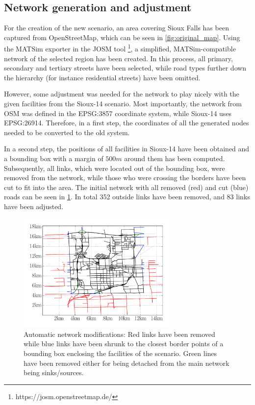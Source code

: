 \subsection{Network generation and adjustment}

For the creation of the new scenario, an area covering Sioux Falls has been captured
from OpenStreetMap, which can be seen in \cref{fig:original_map}. Using the MATSim
exporter in the JOSM tool \footnote{https://josm.openstreetmap.de/}, a simplified,
MATSim-compatible network of the selected region has been created. In this process,
all primary, secondary and tertiary streets have been selected, while road types
further down the hierarchy (for instance residential streets) have been omitted.

However, some adjustment was needed for the network to play nicely with
the given facilities from the Sioux-14 scenario. Most importantly, the network from
OSM was defined in the EPSG:3857 coordinate system, while Sioux-14 uses EPSG:26914.
Therefore, in a first step, the coordinates of all the generated nodes needed to
be converted to the old system.

In a second step, the positions of all facilities in Sioux-14 have been obtained
and a bounding box with a margin of $500m$ around them has been computed. Subsequently,
all links, which were located out of the bounding box, were removed from the network,
while those who were crossing the borders have been cut to fit into the area. The
initial network with all removed (red) and cut (blue) roads can be seen in \cref{fig:sioux_step2}.
In total 352 outside links have been removed, and 83 links have been adjusted.

\begin{figure}
    \centering
    \includegraphics[width=0.7\textwidth]{figures/sioux_step2.pdf}
    \caption{Automatic network modifications: Red links have been removed while
    blue links have been shrunk to the closest border points of a bounding box
    enclosing the facilities of the scenario. Green lines have been removed either
    for being detached from the main network being sinks/sources.}
    \label{fig:sioux_step2}
\end{figure}

